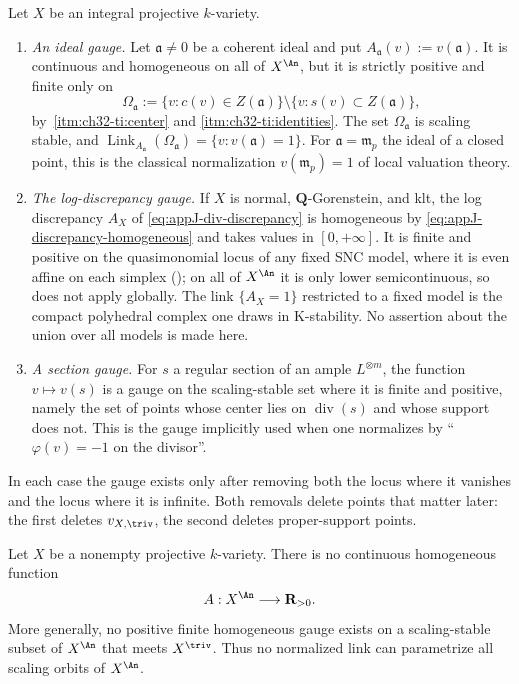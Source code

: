\begin{example}
\label{ex:ch32-three-gauges}
Let $X$ be an integral projective $k$-variety.
\begin{enumerate}
\item\emph{An ideal gauge.}  Let $\mathfrak a\neq0$ be a coherent ideal and
put $A_{\mathfrak a}(v):=v(\mathfrak a)$.  It is continuous and homogeneous
on all of $X^{\An}$, but it is strictly positive and finite only on
\[
 \Omega_{\mathfrak a}
 :=\{v:c(v)\in Z(\mathfrak a)\}\setminus\{v:s(v)\subset Z(\mathfrak a)\},
\]
by \,\cref{itm:ch32-ti:center} and
\cref{itm:ch32-ti:identities}.  The set $\Omega_{\mathfrak a}$ is scaling
stable, and $\operatorname{Link}_{A_{\mathfrak a}}(\Omega_{\mathfrak a})
=\{v:v(\mathfrak a)=1\}$.  For $\mathfrak a=\mathfrak m_p$ the ideal of a
closed point, this is the classical normalization
$v(\mathfrak m_p)=1$ of local valuation theory.
\item\emph{The log-discrepancy gauge.}  If $X$ is normal,
$\mathbf Q$-Gorenstein, and klt, the log discrepancy $A_X$ of
\eqref{eq:appJ-div-discrepancy} is homogeneous by
\eqref{eq:appJ-discrepancy-homogeneous} and takes values in
$[0,+\infty]$.  It is finite and positive on the quasimonomial locus of any
fixed SNC model, where it is even affine on each simplex
(); on all of $X^{\An}$ it is only
lower semicontinuous, so  does not apply globally.
The link $\{A_X=1\}$ restricted to a fixed model is the compact
polyhedral complex one draws in K-stability.  No assertion about the union
over all models is made here.
\item\emph{A section gauge.}  For $s$ a regular section of an ample
$L^{\otimes m}$, the function $v\mapsto v(s)$ is a gauge on the
scaling-stable set where it is finite and positive, namely the set of points
whose center lies on $\operatorname{div}(s)$ and whose support does not.
This is the gauge implicitly used when one normalizes by
``$\varphi(v)=-1$ on the divisor''.
\end{enumerate}
In each case the gauge exists only after removing both the locus where it
vanishes and the locus where it is infinite.  Both removals delete points
that matter later: the first deletes $v_{X,\triv}$, the second deletes
proper-support points.
\end{example}

\begin{theorem}
\label{thm:ch32-no-compact-link}
Let $X$ be a nonempty projective $k$-variety.  There is no continuous
homogeneous function
\[
                 A:X^{\An}\longrightarrow\mathbf R_{>0}.
\]
More generally, no positive finite homogeneous gauge exists on a
scaling-stable subset of $X^{\An}$ that meets $X^{\triv}$.  Thus no
normalized link can parametrize all scaling orbits of $X^{\An}$.
\end{theorem}

